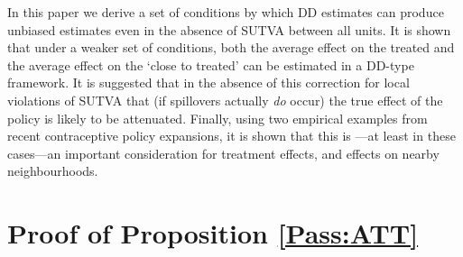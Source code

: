 In this paper we derive a set of conditions by which DD estimates can produce 
unbiased estimates even in the absence of SUTVA between all units.  It is shown
that under a weaker set of conditions, both the average effect on the treated
and the average effect on the `close to treated' can be estimated in a DD-type
framework.  It is suggested that in the absence of this correction for local 
violations of SUTVA that (if spillovers actually \emph{do} occur) the true 
effect of the policy is likely to be attenuated.  Finally, using two empirical 
examples from recent contraceptive policy expansions, it is shown that this is%
---at least in these cases---an important consideration for treatment effects, 
and effects on nearby neighbourhoods.


\newpage

\appendix
\section{Proof of Proposition \ref{Pass:ATT}}
\renewcommand{\qedsymbol}{$\blacksquare$}
